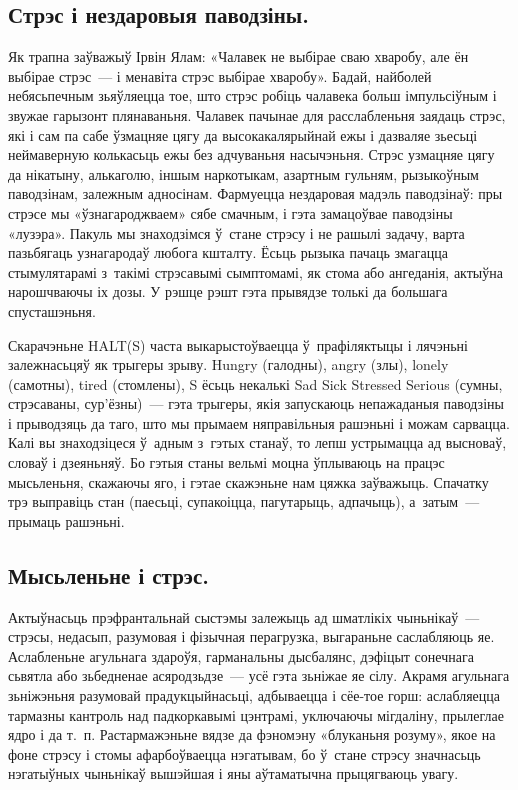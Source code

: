 \subsection*{Стрэс і нездаровыя паводзіны.}

Як трапна заўважыў Ірвін Ялам: «Чалавек не выбірае сваю хваробу, але ён выбірае стрэс~--- і менавіта стрэс выбірае хваробу». Бадай, найболей небясьпечным зьяўляецца тое, што стрэс робіць чалавека больш імпульсіўным і звужае гарызонт плянаваньня. Чалавек пачынае для расслабленьня заядаць стрэс, які і сам па сабе ўзмацняе цягу да высокакалярыйнай ежы і дазваляе зьесьці неймаверную колькасьць ежы без адчуваньня насычэньня. Стрэс узмацняе цягу да нікатыну, алькаголю, іншым наркотыкам, азартным гульням, рызыкоўным паводзінам, залежным адносінам. Фармуецца нездаровая мадэль паводзінаў: пры стрэсе мы «ўзнагароджваем» сябе смачным, і гэта замацоўвае паводзіны «лузэра». Пакуль мы знаходзімся ў~стане стрэсу і не рашылі задачу, варта пазьбягаць узнагародаў любога кшталту. Ёсьць рызыка пачаць змагацца стымулятарамі з~такімі стрэсавымі сымптомамі, як стома або ангеданія, актыўна нарошчваючы іх дозы. У рэшце рэшт гэта прывядзе толькі да большага спусташэньня. 


Скарачэньне HALT(S) часта выкарыстоўваецца ў~прафіляктыцы і лячэньні залежнасьцяў як трыгеры зрыву. Hungry (галодны), angry (злы), lonely (самотны), tired (стомлены), S ёсьць некалькі Sad Sick Stressed Serious (сумны, стрэсаваны, сур'ёзны)~--- гэта трыгеры, якія запускаюць непажаданыя паводзіны і прыводзяць да таго, што мы прымаем няправільныя рашэньні і можам сарвацца. Калі вы знаходзіцеся ў~адным з~гэтых станаў, то лепш устрымацца ад высноваў, словаў і дзеяньняў. Бо гэтыя станы вельмі моцна ўплываюць на працэс мысьленьня, скажаючы яго, і гэтае скажэньне нам цяжка заўважыць. Спачатку трэ выправіць стан (паесьці, супакоіцца, пагутарыць, адпачыць), а~затым~--- прымаць рашэньні.

\subsection*{Мысьленьне і стрэс.}

Актыўнасьць прэфрантальнай сыстэмы залежыць ад шматлікіх чыньнікаў~--- стрэсы, недасып, разумовая і фізычная перагрузка, выгараньне саслабляюць яе. Аслабленьне агульнага здароўя, гарманальны дысбалянс, дэфіцыт сонечнага сьвятла або зьбедненае асяродзьдзе~--- усё гэта зьніжае яе сілу. Акрамя агульнага зьніжэньня разумовай прадукцыйнасьці, адбываецца і сёе-тое горш: аслабляецца тармазны кантроль над падкоркавымі цэнтрамі, уключаючы мігдаліну, прылеглае ядро і да т.~п. Растармажэньне вядзе да фэномэну «блуканьня розуму», якое на фоне стрэсу і стомы афарбоўваецца нэгатывам, бо ў~стане стрэсу значнасьць нэгатыўных чыньнікаў вышэйшая і яны аўтаматычна прыцягваюць увагу.

